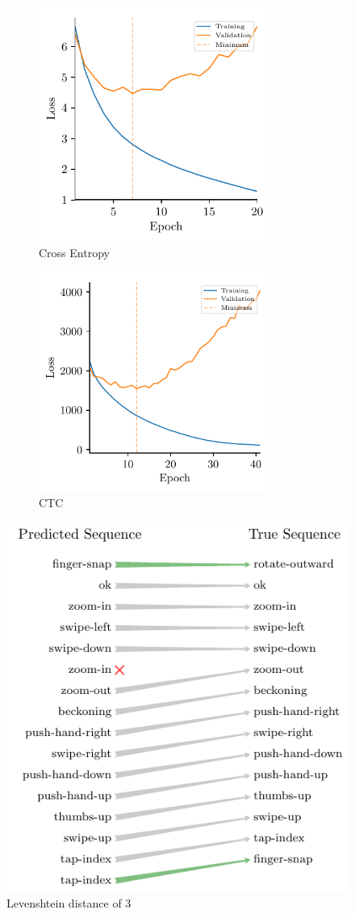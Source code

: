 \begin{figure}[h]
  \begin{subfigure}{3in}
  \centering
    \includegraphics[width=3in]{figures/results/losses/gru-events}
    \caption{Cross Entropy}
  \end{subfigure}
  \hfill
  \begin{subfigure}{3in}
  \centering
    \includegraphics[width=3in]{figures/results/losses/ctc-events}
    \caption{CTC}
  \end{subfigure}
  \caption{}
  \label{fig:loss-events}
\end{figure}

\begin{figure}[h]
  \centering
  \includegraphics{figures/results/levenshtein}
  \caption{Levenshtein distance of 3}
  \label{fig:levenshtein}
\end{figure}
